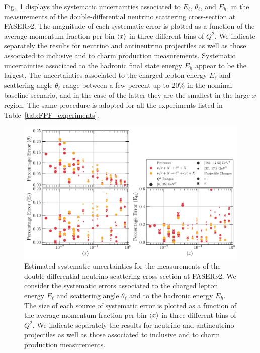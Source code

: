 Fig.~\ref{fig:percentage_uncertainties_overview}
displays the systematic uncertainties associated
to $E_\ell$, $\theta_\ell$, and $E_h$.
in the  measurements
of the double-differential
neutrino scattering cross-section at FASER$\nu$2.
%
The magnitude of each systematic error is plotted as a function
of the average momentum fraction per bin $\left\langle x\right\rangle$
in three different bins of $Q^2$.
%
We indicate separately the results for neutrino and antineutrino projectiles as well as
those associated to inclusive and to charm production measurements.
%
Systematic uncertainties associated to the hadronic final state energy $E_h$ appear to be the largest.
%
The uncertainties associated to the charged lepton energy $E_\ell$ and scattering angle $\theta_\ell$ range
between a few percent up to 20\% in the nominal baseline scenario,
and in the case of the latter they are the smallest in the large-$x$ region.
%
The same procedure is adopted for all the experiments listed in Table~\ref{tab:FPF_experiments}.

\begin{figure}[!ht]
  \centering
  \includegraphics[width=\textwidth]{plots/percentage_errors.pdf}
  \caption{\small Estimated systematic uncertainties for the  measurements
    of the double-differential
    neutrino scattering cross-section at FASER$\nu$2.
    We consider the systematic errors
    associated to the charged lepton energy $E_\ell$ and scattering angle $\theta_\ell$
    and to the hadronic energy $E_h$.
    The size of each source of systematic error is plotted as a function
    of the average momentum fraction per bin $\left\langle x\right\rangle$
    in three different bins of $Q^2$.
    We indicate separately the results for neutrino and antineutrino projectiles as well as
    those associated to inclusive and to charm production measurements.
  }
  \label{fig:percentage_uncertainties_overview}
\end{figure}


